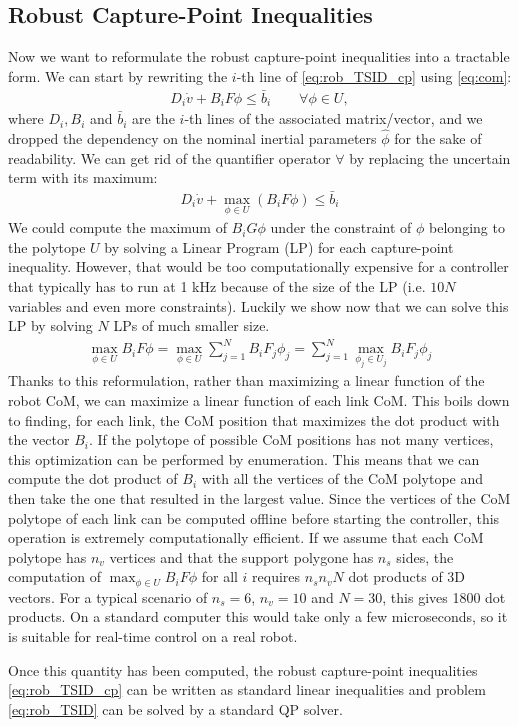 \subsection{Robust Capture-Point Inequalities}
Now we want to reformulate the robust capture-point inequalities into a tractable form.
We can start by rewriting the $i$-th line of \eqref{eq:rob_TSID_cp} using \eqref{eq:com}:
\begin{align*}
D_i \dot{v} + B_i F \phi \le \bar{b}_i \qquad \forall \phi \in U,
\end{align*}
where $D_i, B_i$ and $\bar{b}_i$ are the $i$-th lines of the associated matrix/vector, and we dropped the dependency on the nominal inertial parameters $\hat{\phi}$ for the sake of readability.
We can get rid of the quantifier operator $\forall$ by replacing the uncertain term with its maximum:
\begin{align}
D_i \dot{v} + \max_{\phi \in U} (B_i F \phi) \le \bar{b}_i
\end{align}
We could compute the maximum of $B_i G \phi$ under the constraint of $\phi$ belonging to the polytope $U$ by solving a Linear Program (LP) for each capture-point inequality.
However, that would be too computationally expensive for a controller that typically has to run at 1 kHz because of the size of the LP (i.e. $10N$ variables and even more constraints).
Luckily we show now that we can solve this LP by solving $N$ LPs of much smaller size.
\begin{align}
\max_{\phi \in U}  B_i F \phi = \max_{\phi \in U}  \sum_{j=1}^N B_i F_j \phi_j = 
\sum_{j=1}^N \max_{\phi_j \in U_j} B_i F_j \phi_j
\end{align}
Thanks to this reformulation, rather than maximizing a linear function of the robot CoM, we can maximize a linear function of each link CoM.
This boils down to finding, for each link, the CoM position that maximizes the dot product with the vector $B_i$.
If the polytope of possible CoM positions has not many vertices, this optimization can be performed by enumeration.
This means that we can compute the dot product of $B_i$ with all the vertices of the CoM polytope and then take the one that resulted in the largest value.
Since the vertices of the CoM polytope of each link can be computed offline before starting the controller, this operation is extremely computationally efficient.
If we assume that each CoM polytope has $n_v$ vertices and that the support polygone has $n_s$ sides, the computation of $\max_{\phi \in U}  B_i F \phi$ for all  $i$ requires $n_s n_v N$ dot products of 3D vectors.
For a typical scenario of $n_s=6$, $n_v=10$ and $N=30$, this gives 1800 dot products.
On a standard computer this would take only a few microseconds, so it is suitable for real-time control on a real robot.

Once this quantity has been computed, the robust capture-point inequalities \eqref{eq:rob_TSID_cp} can be written as standard linear inequalities and problem \eqref{eq:rob_TSID} can be solved by a standard QP solver.


